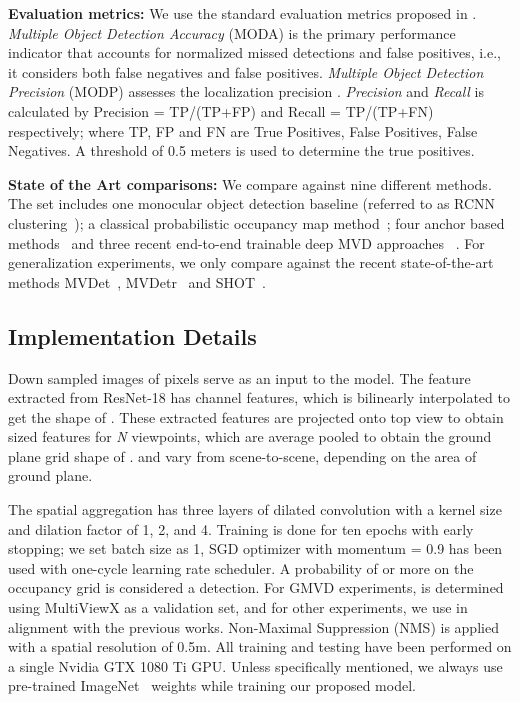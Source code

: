\documentclass[letterpaper, 10 pt, conference]{ieeeconf}  \usepackage{times}
\newcommand{\sota}{state-of-the-art }
\begin{document}
\textbf{Evaluation metrics:} We use the standard evaluation metrics proposed in \cite{Chavdarova2018WILDTRACKAM}. \emph{Multiple Object Detection Accuracy} (MODA) is the primary performance indicator that accounts for normalized missed detections and false positives, i.e., it considers both false negatives and false positives. \emph{Multiple Object Detection Precision} (MODP) assesses the localization precision \cite{Kasturi2009FrameworkFP}. \emph{Precision} and \emph{Recall} is calculated by Precision = TP/(TP+FP) and Recall = TP/(TP+FN) respectively; where TP, FP and FN are True Positives, False Positives, False Negatives. A threshold of 0.5 meters is used to determine the true positives.

\textbf{State of the Art comparisons:}
We compare against nine different methods. The set includes one monocular object detection baseline (referred to as RCNN clustering~\cite{xu2016multi}); a classical probabilistic occupancy map method~\cite{Fleuret2008MulticameraPT}; four anchor based methods~\cite{Lima2021GeneralizableM3,Baqu2017DeepOR,Chavdarova2017DeepMP,LpezCifuentes2018SemanticDM} and three recent end-to-end trainable deep MVD approaches ~\cite{hou2020multiview,hou2021multiview,song2021stacked}. For generalization experiments, we only compare against the recent \sota methods MVDet~\cite{hou2020multiview}, MVDetr~\cite{hou2021multiview} and SHOT~\cite{song2021stacked}.



\subsection{Implementation Details}

Down sampled images of  pixels serve as an input to the model. The feature extracted from ResNet-18 has  channel features, which is bilinearly interpolated to get the shape of . These  extracted features are projected onto top view to obtain  sized features for {\it N} viewpoints, which are average pooled to obtain the ground plane grid shape of .  and  vary from scene-to-scene, depending on the area of ground plane. 

The spatial aggregation has three layers of dilated convolution with a  kernel size and dilation factor of 1, 2, and 4. Training is done for ten epochs with early stopping; we set batch size as 1, SGD optimizer with momentum = 0.9 has been used with one-cycle learning rate scheduler. A probability of  or more on the occupancy grid is considered a detection. For GMVD experiments,  is determined using MultiViewX as a validation set, and for other experiments, we use  in alignment with the previous works. Non-Maximal Suppression (NMS) is applied with a spatial resolution of 0.5m. All training and testing have been performed on a single Nvidia GTX 1080 Ti GPU. Unless specifically mentioned, we always use pre-trained ImageNet~\cite{Deng2009ImageNetAL} weights while training our proposed model.
\end{document}

